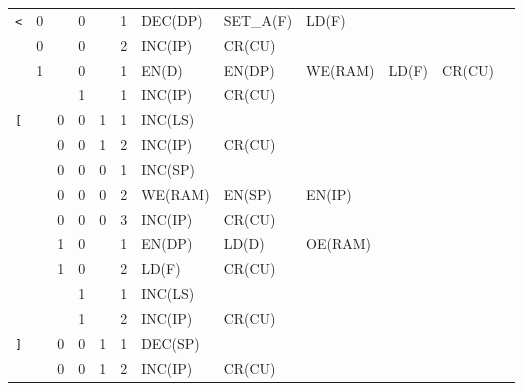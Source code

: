 \begin{longtable}[c] {c|cccc|c|llllll}
    \rowcolor{White} \texttt{<}   & 0 &   & 0     &      & 1     & DEC(DP)  & SET\_A(F)& LD(F)   &        &        &        \\
    \rowcolor{White}              & 0 &   & 0     &      & 2     & INC(IP)  & CR(CU)   &         &        &        &        \\
    \rowcolor{Gray}               & 1 &   & 0     &      & 1     & EN(D)    & EN(DP)   & WE(RAM) & LD(F)  & CR(CU) &        \\
    \rowcolor{White}              &   &   & 1     &      & 1     & INC(IP)  & CR(CU)   &         &        &        &        \\ \hline
    
    \rowcolor{Gray}  \texttt{[}   &   & 0 & 0     & 1    & 1     & INC(LS)  &          &         &        &        &        \\
    \rowcolor{Gray}               &   & 0 & 0     & 1    & 2     & INC(IP)  & CR(CU)   &         &        &        &        \\      
    \rowcolor{White}              &   & 0 & 0     & 0    & 1     & INC(SP)  &          &         &        &        &        \\
    \rowcolor{White}              &   & 0 & 0     & 0    & 2     & WE(RAM)  & EN(SP)   & EN(IP)  &        &        &        \\
    \rowcolor{White}              &   & 0 & 0     & 0    & 3     & INC(IP)  & CR(CU)   &         &        &        &        \\
    \rowcolor{Gray}               &   & 1 & 0     &      & 1     & EN(DP)   & LD(D)    & OE(RAM) &        &        &        \\
    \rowcolor{Gray}               &   & 1 & 0     &      & 2     & LD(F)    & CR(CU)   &         &        &        &        \\
    \rowcolor{White}              &   &   & 1     &      & 1     & INC(LS)  &          &         &        &        &        \\
    \rowcolor{White}              &   &   & 1     &      & 2     & INC(IP)  & CR(CU)   &         &        &        &        \\ \hline
    
    \rowcolor{White} \texttt{]}   &   & 0 & 0     & 1    & 1     & DEC(SP)  &          &         &        &        &        \\
    \rowcolor{White}              &   & 0 & 0     & 1    & 2     & INC(IP)  & CR(CU)   &         &        &        &        \\
        

\end{longtable}
